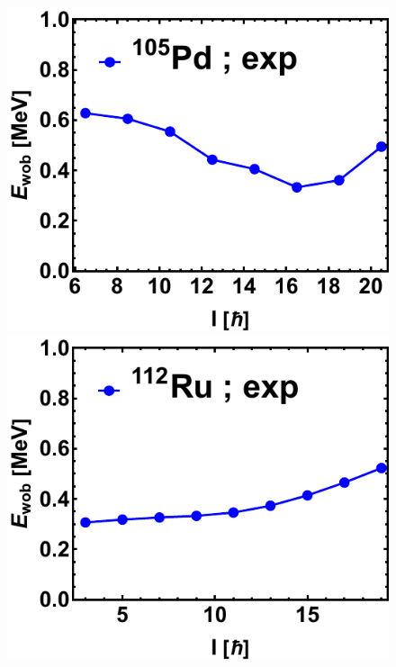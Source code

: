 \begin{figure}
    \centering
    \includegraphics[scale=0.5]{Chapters/Figures/wobblers/105Pd.pdf}
    \includegraphics[scale=0.5]{Chapters/Figures/wobblers/112Ru.pdf}

\end{figure}
